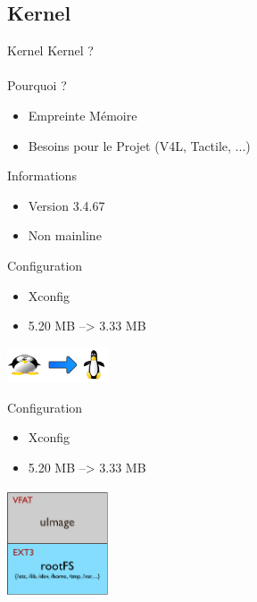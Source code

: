 \documentclass[11pt]{beamer}
\begin{document}
	
	\subsection{Kernel}
	\begin{frame}[label=Kernel]{Kernel}
	Kernel ? \\ \hyperlink{Linux}{}\\
	\pause
	Pourquoi ?
	\pause
	 \begin{itemize}
	  \item Empreinte Mémoire
	  \pause
	  \item Besoins pour le Projet (V4L, Tactile, ...)
	 \end{itemize}
	  \pause
		\begin{block}{Informations}
		\begin{itemize}
			\item Version 3.4.67
			\item Non mainline \\
			\href{https://github.com/linux-sunxi/linux-sunxi}{}
		\end{itemize}
		\end{block}
	\end{frame}
	
	\begin{frame}{Configuration}
	 \begin{itemize}
	  \item Xconfig
	  \item 5.20 MB --> 3.33 MB
	 \end{itemize}
	\includegraphics[width=3cm]{common/tuxleg.png}\\
	\end{frame}
	
	\begin{frame}{Configuration}
	 \begin{itemize}
	  \item Xconfig
	  \item 5.20 MB --> 3.33 MB
	 \end{itemize}
	\includegraphics[width=3cm]{common/SD.png}\\
	\end{frame}
	
\end{document}
